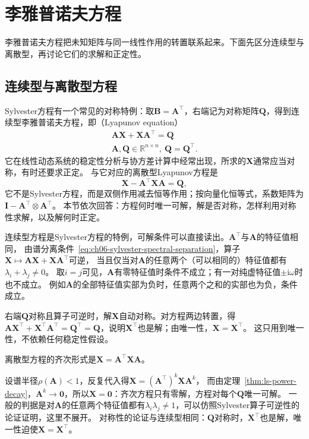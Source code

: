\section{李雅普诺夫方程}
\label{sec:ls-lyapunov}

李雅普诺夫方程把未知矩阵与同一线性作用的转置联系起来。下面先区分连续型与离散型，再讨论它们的求解和正定性。

\subsection{连续型与离散型方程}
\label{sec:ls-lyapunov-solvability}

Sylvester方程有一个常见的对称特例：取$\bm B=\bm A^\top$，右端记为对称矩阵$\bm Q$，得到连续型李雅普诺夫方程，即（Lyapunov equation）
\[
 \begin{gathered}
\bm A\bm X+\bm X\bm A^\top=\bm Q\\
\bm A,\bm Q\in\mathbb R^{n\times n},\ \bm Q=\bm Q^\top .
 \end{gathered}
\]
它在线性动态系统的稳定性分析与协方差计算中经常出现，所求的$\bm X$通常应当对称，有时还要求正定。
与它对应的离散型Lyapunov方程是
\[
 \bm X-\bm A^\top\bm X\bm A=\bm Q ,
\]
它不是Sylvester方程，而是双侧作用减去恒等作用；按向量化恒等式，系数矩阵为$\bm I-\bm A^\top\otimes\bm A^\top$。
本节依次回答：方程何时唯一可解，解是否对称，怎样利用对称性求解，以及解何时正定。


连续型方程是Sylvester方程的特例，可解条件可以直接读出。$\bm A^\top$与$\bm A$的特征值相同，
由谱分离条件~\eqref{eq:ch06-sylvester-spectral-separation}，算子$\bm X\mapsto\bm A\bm X+\bm X\bm A^\top$可逆，
当且仅当对$\bm A$的任意两个（可以相同的）特征值都有$\lambda_i+\lambda_j\neq0$。
取$i=j$可见，$\bm A$有零特征值时条件不成立；有一对纯虚特征值$\pm\mathrm i\omega$时也不成立。
例如$\bm A$的全部特征值实部为负时，任意两个之和的实部也为负，条件成立。

右端$\bm Q$对称且算子可逆时，解$\bm X$自动对称。对方程两边转置，得
$\bm A\bm X^\top+\bm X^\top\bm A^\top=\bm Q^\top=\bm Q$，说明$\bm X^\top$也是解；由唯一性，$\bm X=\bm X^\top$。
这只用到唯一性，不依赖任何稳定性假设。

离散型方程的齐次形式是$\bm X=\bm A^\top\bm X\bm A$。

设谱半径$\rho(\bm A)<1$，反复代入得$\bm X=(\bm A^\top)^k\bm X\bm A^k$，
而由定理~\ref{thm:ls-power-decay}，$\bm A^k\to\bm0$，所以$\bm X=\bm0$：齐次方程只有零解，方程对每个$\bm Q$唯一可解。
一般的判据是对$\bm A$的任意两个特征值都有$\lambda_i\lambda_j\neq1$，可以仿照Sylvester算子可逆性的论证证明，这里不展开。
对称性的论证与连续型相同：$\bm Q$对称时，$\bm X^\top$也是解，唯一性迫使$\bm X=\bm X^\top$。

